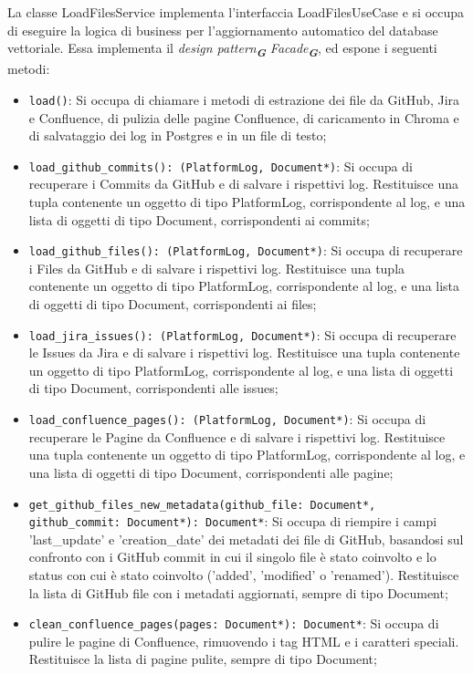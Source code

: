 \label{sec:load_files_service}
La classe LoadFilesService implementa l'interfaccia LoadFilesUseCase e si occupa di eseguire la logica di business per l'aggiornamento automatico del database vettoriale. Essa implementa il \emph{design pattern}\textsubscript{\textbf{\textit{G}}} \emph{Facade}\textsubscript{\textbf{\textit{G}}}, ed espone i seguenti metodi:
\begin{itemize}
    \item \texttt{load()}: Si occupa di chiamare i metodi di estrazione dei file da GitHub, Jira e Confluence, di pulizia delle pagine Confluence, di caricamento in Chroma e di salvataggio dei log in Postgres e in un file di testo;
    \item \texttt{load\_github\_commits(): (PlatformLog, Document*)}: Si occupa di recuperare i Commits da GitHub e di salvare i rispettivi log. Restituisce una tupla contenente un oggetto di tipo PlatformLog, corrispondente al log, e una lista di oggetti di tipo Document, corrispondenti ai commits;
    \item \texttt{load\_github\_files(): (PlatformLog, Document*)}: Si occupa di recuperare i Files da GitHub e di salvare i rispettivi log. Restituisce una tupla contenente un oggetto di tipo PlatformLog, corrispondente al log, e una lista di oggetti di tipo Document, corrispondenti ai files;
    \item \texttt{load\_jira\_issues(): (PlatformLog, Document*)}: Si occupa di recuperare le Issues da Jira e di salvare i rispettivi log. Restituisce una tupla contenente un oggetto di tipo PlatformLog, corrispondente al log, e una lista di oggetti di tipo Document, corrispondenti alle issues;
    \item \texttt{load\_confluence\_pages(): (PlatformLog, Document*)}: Si occupa di recuperare le Pagine da Confluence e di salvare i rispettivi log. Restituisce una tupla contenente un oggetto di tipo PlatformLog, corrispondente al log, e una lista di oggetti di tipo Document, corrispondenti alle pagine;
    \item \texttt{get\_github\_files\_new\_metadata(github\_file: Document*, github\_commit: Document*): Document*}: Si occupa di riempire i campi 'last\_update' e 'creation\_date' dei metadati dei file di GitHub, basandosi sul confronto con i GitHub commit in cui il singolo file è stato coinvolto e lo status con cui è stato coinvolto ('added', 'modified' o 'renamed'). Restituisce la lista di GitHub file con i metadati aggiornati, sempre di tipo Document;
    \item \texttt{clean\_confluence\_pages(pages: Document*): Document*}: Si occupa di pulire le pagine di Confluence, rimuovendo i tag HTML e i caratteri speciali. Restituisce la lista di pagine pulite, sempre di tipo Document;

\end{itemize}
